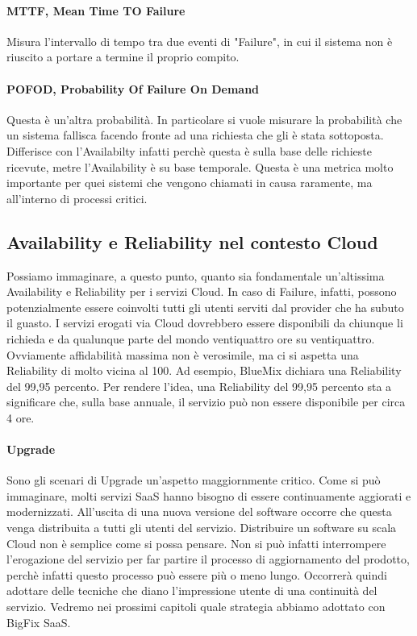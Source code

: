 \paragraph{MTTF, Mean Time TO Failure}
Misura l'intervallo di tempo tra due eventi di "Failure", in cui il sistema non è riuscito a portare a termine il proprio compito.

\paragraph{POFOD, Probability Of Failure On Demand} 
Questa è un'altra probabilità. In particolare si vuole misurare la probabilità che un sistema fallisca facendo fronte ad una richiesta che gli è stata sottoposta. Differisce con l'Availabilty infatti perchè questa è sulla base delle richieste ricevute, metre l'Availability è su base temporale. Questa è una metrica molto importante per quei sistemi che vengono chiamati in causa raramente, ma all'interno di processi critici.


\subsection{Availability e Reliability nel contesto Cloud}
Possiamo immaginare, a questo punto, quanto sia fondamentale un'altissima Availability e Reliability per i servizi Cloud. In caso di Failure, infatti, possono potenzialmente essere coinvolti tutti gli utenti serviti dal provider che ha subuto il guasto. I servizi erogati via Cloud dovrebbero essere disponibili da chiunque li richieda e da qualunque parte del mondo ventiquattro ore su ventiquattro. Ovviamente affidabilità massima non è verosimile, ma ci si aspetta una Reliability di molto vicina al 100. Ad esempio, BlueMix dichiara una Reliability del 99,95 percento. Per rendere l'idea, una Reliability del 99,95 percento sta a significare che, sulla base annuale, il servizio può non essere disponibile per circa 4 ore. 

\paragraph{Upgrade}
Sono gli scenari di Upgrade un'aspetto maggiornmente critico. Come si può immaginare, molti servizi SaaS hanno bisogno di essere continuamente aggiorati e modernizzati. All'uscita di una nuova versione del software occorre che questa venga distribuita a tutti gli utenti del servizio. Distribuire un software su scala Cloud non è semplice come si possa pensare. Non si può infatti interrompere l'erogazione del servizio per far partire il processo di aggiornamento del prodotto, perchè infatti questo processo può essere più o meno lungo. Occorrerà quindi adottare delle tecniche che diano l'impressione utente di una continuità del servizio. Vedremo nei prossimi capitoli quale strategia abbiamo adottato con BigFix SaaS. 

